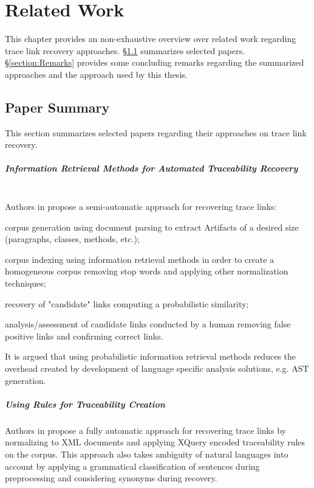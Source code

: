 \chapter{Related Work}
\label{chapter:RelatedWork}
This chapter provides an non-exhaustive overview over related work regarding trace link recovery approaches.
§\ref{section:PaperSummary} summarizes selected papers.
§\ref{section:Remarks} provides some concluding remarks regarding the summarized approaches and the approach used by this thesis.

\section{Paper Summary}
\label{section:PaperSummary}
This section summarizes selected papers regarding their approaches on trace link recovery.

\paragraph*{Information Retrieval Methods for Automated Traceability Recovery}
~\\Authors in \cite{DBLP:books/daglib/p/LuciaMOP12}
propose a semi-automatic approach for recovering trace links: 
\begin{enumerate*}[label={(\roman*)}]
\item
corpus generation using document parsing to extract \glspl{Artifact} of a desired size (paragraphs, classes, methods, etc.);
\item
corpus indexing using information retrieval methods in order to create a homogeneous corpus removing stop words and applying other normalization techniques;
\item
recovery of "candidate" links computing a probabilistic similarity;
\item
analysis/assessment of candidate links conducted by a human removing false positive links and confirming correct links.
\end{enumerate*}
It is argued that using probabilistic information retrieval methods reduces the  overhead created by development of language specific analysis solutions, e.g. \gls{AST} generation.

\paragraph*{Using Rules for Traceability Creation} 
Authors in \cite{DBLP:books/daglib/p/Zisman12}
propose a fully automatic approach for recovering trace links by normalizing to \gls{XML} documents and applying XQuery encoded traceability rules on the corpus.
This approach also takes ambiguity of natural languages into account by applying a grammatical classification of sentences during preprocessing and considering synonyms during recovery.

